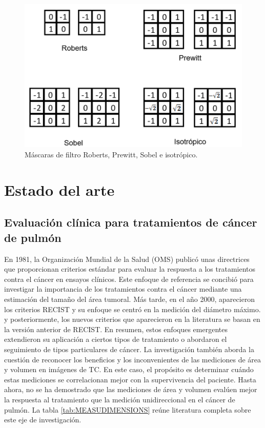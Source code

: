 \documentclass[11pt,a4paper,openany]{article}
\begin{document}
    \begin{figure}[H]
        \centering
        \includegraphics[scale=0.6]{Img_filtros-gradiente.png}
        \caption{Máscaras de filtro Roberts, Prewitt, Sobel e isotrópico.}\label{Fig:MFG}
    \end{figure}


\section{Estado del arte}

    \subsection{Evaluación clínica para tratamientos de cáncer de pulmón}
    En 1981, la Organización Mundial de la Salud (OMS) publicó unas directrices que proporcionan criterios estándar para evaluar la respuesta a los tratamientos contra el cáncer en ensayos clínicos. Este enfoque de referencia se concibió para investigar la importancia de los tratamientos contra el cáncer mediante una estimación del tamaño del área tumoral. Más tarde, en el año 2000, aparecieron los  criterios RECIST y su enfoque se centró en la medición del diámetro máximo. y posteriormente, los nuevos criterios que aparecieron en la literatura se basan en la versión anterior de RECIST. En resumen, estos enfoques emergentes extendieron su aplicación a ciertos tipos de tratamiento o abordaron el seguimiento de tipos particulares de cáncer. La investigación también aborda la cuestión de reconocer los beneficios y los inconvenientes de las mediciones de área y volumen en imágenes de TC. En este caso, el propósito es determinar cuándo estas mediciones se correlacionan mejor con la supervivencia del paciente. Hasta ahora, no se ha demostrado que las mediciones de área y volumen evalúen mejor la respuesta al tratamiento que la medición unidireccional en el cáncer de pulmón. La tabla \ref{tab:MEASUDIMENSIONS} reúne literatura completa sobre este eje de investigación.\\
\end{document}
